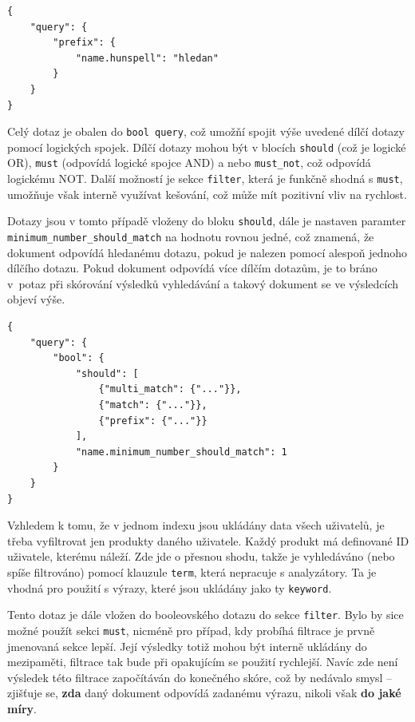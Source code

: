 \documentclass[FM,DP]{tulthesis}
\newenvironment{code}
    {\filbreak\captionsetup{type=listing}}{\filbreak}
\begin{document}
\begin{code}
\captionsetup{singlelinecheck=false,justification=raggedright}
\label{code:es-search-3}
\begin{verbatim}
{
    "query": {
        "prefix": {
            "name.hunspell": "hledan"
        }
    }
}
\end{verbatim}
\end{code}

Celý dotaz je obalen do \verb|bool query|, což umožňí spojit výše uvedené dílčí dotazy pomocí
logických spojek. Dílčí dotazy mohou být v blocích \verb|should| (což je logické OR), 
\verb|must| (odpovídá logické spojce AND) a nebo \verb|must_not|, což odpovídá logickému NOT.
Další možností je sekce \verb|filter|, která je funkčně shodná s \verb|must|, umožňuje však
interně využívat kešování, což může mít pozitivní vliv na rychlost.

Dotazy jsou v tomto případě vloženy do bloku \verb|should|, dále je nastaven paramter
\verb|minimum_number_should_match| na hodnotu rovnou jedné, což znamená, že dokument odpovídá
hledanému dotazu, pokud je nalezen pomocí alespoň jednoho dílčího dotazu.
Pokud dokument odpovídá více dílčím dotazům, je to bráno v~potaz při skórování
výsledků vyhledávání a takový dokument se ve výsledcích objeví výše.

\begin{code}
\captionsetup{singlelinecheck=false,justification=raggedright}
\label{code:es-search-4}
\begin{verbatim}
{
    "query": {
        "bool": {
            "should": [
                {"multi_match": {"..."}},
                {"match": {"..."}},
                {"prefix": {"..."}}
            ],
            "name.minimum_number_should_match": 1
        }
    }
}
\end{verbatim}
\end{code}

Vzhledem k tomu, že v jednom indexu jsou ukládány data všech uživatelů, je třeba vyfiltrovat
jen produkty daného uživatele. Každý produkt má definované ID uživatele, kterému náleží. 
Zde jde o přesnou shodu, takže je vyhledáváno (nebo spíše filtrováno) pomocí klauzule
\verb|term|, která nepracuje s analyzátory. Ta je vhodná pro použití s výrazy, které
jsou ukládány jako ty \verb|keyword|.

Tento dotaz je dále vložen do booleovského dotazu do sekce \verb|filter|. Bylo by sice 
možné použít sekci \verb|must|, nicméně pro případ, kdy probíhá filtrace je prvně 
jmenovaná sekce lepší. Její výsledky totiž mohou být interně ukládány do mezipaměti, 
filtrace tak bude při opakujícím se použití rychlejší. Navíc zde není výsledek
této filtrace započítáván do konečného skóre, což by nedávalo smysl -- zjišťuje se, 
\textbf{zda} daný dokument odpovídá zadanému výrazu, nikoli však \textbf{do jaké míry}.
\end{document}
